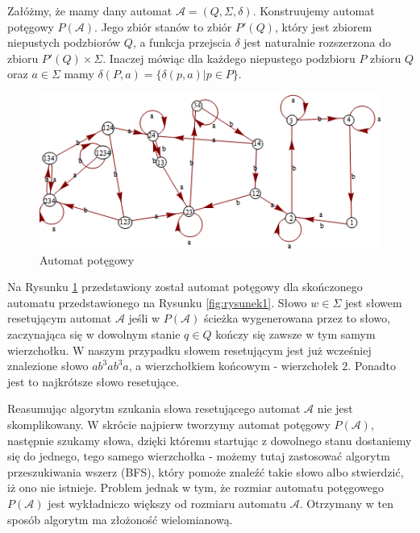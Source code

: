 \documentclass[12pt,a4paper]{article}
\begin{document}
Za{\l}\'{o}\.{z}my, \.{z}e mamy dany automat  $\mathscr{A}=(Q, \Sigma, \delta)$. Konstruujemy automat pot\k{e}gowy $P(\mathscr{A})$. Jego zbi\'{o}r stan\'{o}w to zbi\'{o}r $P'(Q)$, kt\'{o}ry jest zbiorem niepustych podzbior\'{o}w $Q$, a funkcja przejscia $\delta$ jest naturalnie rozszerzona do zbioru $P'(Q)\times \Sigma$. Inaczej m\'{o}wi\k{a}c dla ka\.{z}dego niepustego podzbioru $P$ zbioru $Q$ oraz $a \in \Sigma$ mamy $\delta(P,a)=\{\delta(p,a) | p \in P\}$.
\\
\begin{figure}[H]
    \includegraphics[width=1.1\textwidth]{rysunek6}
    \caption{Automat pot\k{e}gowy}
    \label{fig:rysunek6}
\end{figure}

Na Rysunku \ref{fig:rysunek6} przedstawiony zosta{\l} automat pot\k{e}gowy dla sko\'{n}czonego automatu przedstawionego na Rysunku \ref{fig:rysunek1}. S{\l}owo $w \in \Sigma$ jest s{\l}owem resetuj\k{a}cym automat $\mathscr{A}$ je\'{s}li w $P(\mathscr{A})$ \'{s}cie\.{z}ka wygenerowana przez to s{\l}owo, zaczynaj\k{a}ca si\k{e} w dowolnym stanie $q \in Q$ ko\'{n}czy si\k{e} zawsze w tym samym wierzcho{\l}ku. W naszym przypadku s{\l}owem resetuj\k{a}cym jest ju\.{z} wcze\'{s}niej znalezione s{\l}owo $ab^3ab^3a$, a wierzcho{\l}kiem ko\'{n}cowym - wierzcho{\l}ek $2$. Ponadto jest to najkr\'{o}tsze s{\l}owo resetuj\k{a}ce. 

Reasumuj\k{a}c algorytm szukania s{\l}owa resetuj\k{a}cego automat $\mathscr{A}$ nie jest skomplikowany. W skr\'{o}cie najpierw tworzymy automat pot\k{e}gowy $P(\mathscr{A})$, nast\k{e}pnie szukamy s{\l}owa, dzi\k{e}ki kt\'{o}remu startuj\k{a}c z dowolnego stanu dostaniemy si\k{e} do jednego, tego samego wierzcho{\l}ka - mo\.{z}emy tutaj zastosowa\'{c} algorytm przeszukiwania 
wszerz (BFS), kt\'{o}ry pomo\.{z}e znale\'{z}\'{c} takie s{\l}owo albo stwierdzi\'{c}, i\.{z} ono nie istnieje. Problem jednak w tym, \.{z}e rozmiar automatu pot\k{e}gowego $P(\mathscr{A})$ jest wyk{\l}adniczo wi\k{e}kszy od rozmiaru automatu $\mathscr{A}$. Otrzymany w ten spos\'{o}b algorytm ma z{\l}o\.{z}ono\'{s}\'{c} wielomianow\k{a}.
\end{document}
